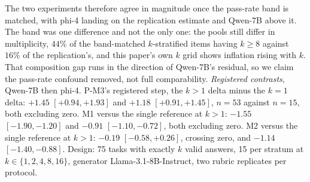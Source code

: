 \documentclass[11pt]{article}
\begin{document}
\begin{table}[tbp]
\begin{minipage}{0.97\textwidth}
The two experiments therefore agree in magnitude once the pass-rate band is matched, with phi-4 landing on the replication estimate and Qwen-7B above it.
The band was one difference and not the only one: the pools still differ in multiplicity, $44\%$ of the band-matched $k$-stratified items having $k \geq 8$ against $16\%$ of the replication's, and this paper's own $k$ grid shows inflation rising with $k$.
That composition gap runs in the direction of Qwen-7B's residual, so we claim the pass-rate confound removed, not full comparability.
\emph{Registered contrasts}, Qwen-7B then phi-4.
P-M3's registered step, the $k{>}1$ delta minus the $k{=}1$ delta: $+1.45$ $[+0.94, +1.93]$ and $+1.18$ $[+0.91, +1.45]$, $n{=}53$ against $n{=}15$, both excluding zero.
M1 versus the single reference at $k{>}1$: $-1.55$ $[-1.90, -1.20]$ and $-0.91$ $[-1.10, -0.72]$, both excluding zero.
M2 versus the single reference at $k{>}1$: $-0.19$ $[-0.58, +0.26]$, crossing zero, and $-1.14$ $[-1.40, -0.88]$.
Design: 75 tasks with exactly $k$ valid answers, 15 per stratum at $k \in \{1,2,4,8,16\}$, generator Llama-3.1-8B-Instruct, two rubric replicates per protocol.
\end{minipage}
\caption{\textbf{Takeaway: making the judge score blind before it sees the reference (M1) removes the measured inflation at $k{>}1$ for both judges and costs nothing at $k{=}1$, though it leaves roughly a third to three fifths of the anchoring premium at every $k$; the soft validity gate (M2) removes the inflation for phi-4 and makes matters worse than a plain reference for Qwen-7B.}
Structural mitigations on the $k$-stratified pool, externally registered at \texttt{osf.io/qugbd} before any data existed.}
\label{tab:struct}
\end{table}
\end{document}
